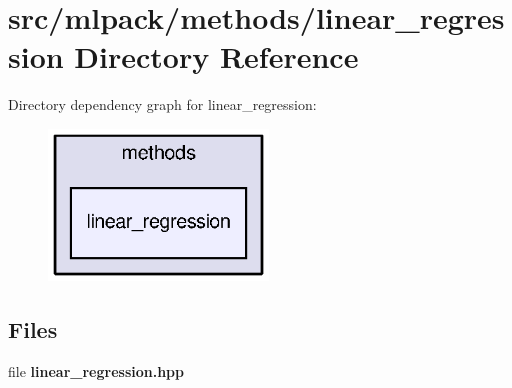 \section{src/mlpack/methods/linear\+\_\+regression Directory Reference}
\label{dir_4d2e3386df08a2adcb8df83d3f41b016}
Directory dependency graph for linear\+\_\+regression\+:
\nopagebreak
\begin{figure}[H]
\begin{center}
\leavevmode
\includegraphics[width=166pt]{dir_4d2e3386df08a2adcb8df83d3f41b016_dep}
\end{center}
\end{figure}
\subsection*{Files}
\begin{DoxyCompactItemize}
\item 
file {\bf linear\+\_\+regression.\+hpp}
\end{DoxyCompactItemize}
